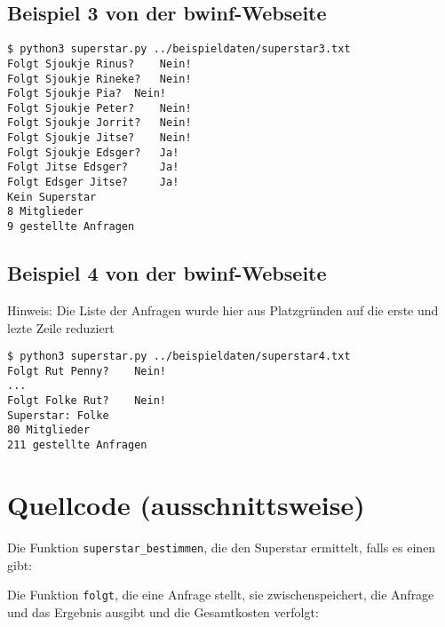 \documentclass[a4paper,10pt,ngerman]{scrartcl}
\begin{document}
\subsection{Beispiel 3 von der bwinf-Webseite}
\begin{lstlisting}
$ python3 superstar.py ../beispieldaten/superstar3.txt
Folgt Sjoukje Rinus? 	Nein!
Folgt Sjoukje Rineke? 	Nein!
Folgt Sjoukje Pia? 	Nein!
Folgt Sjoukje Peter? 	Nein!
Folgt Sjoukje Jorrit? 	Nein!
Folgt Sjoukje Jitse? 	Nein!
Folgt Sjoukje Edsger? 	Ja!
Folgt Jitse Edsger? 	Ja!
Folgt Edsger Jitse? 	Ja!
Kein Superstar
8 Mitglieder
9 gestellte Anfragen
\end{lstlisting}

\subsection{Beispiel 4 von der bwinf-Webseite}
Hinweis: Die Liste der Anfragen wurde hier aus Platzgründen auf die erste und lezte Zeile reduziert
\begin{lstlisting}
$ python3 superstar.py ../beispieldaten/superstar4.txt
Folgt Rut Penny? 	Nein!
...
Folgt Folke Rut? 	Nein!
Superstar: Folke
80 Mitglieder
211 gestellte Anfragen
\end{lstlisting}

\section{Quellcode (ausschnittsweise)}

Die Funktion \texttt{superstar\_bestimmen}, die den Superstar ermittelt, falls es einen gibt:


\vspace{30pt}

Die Funktion \texttt{folgt}, die eine Anfrage stellt, sie zwischenspeichert, die Anfrage und das Ergebnis ausgibt und die Gesamtkosten verfolgt:

\end{document}
